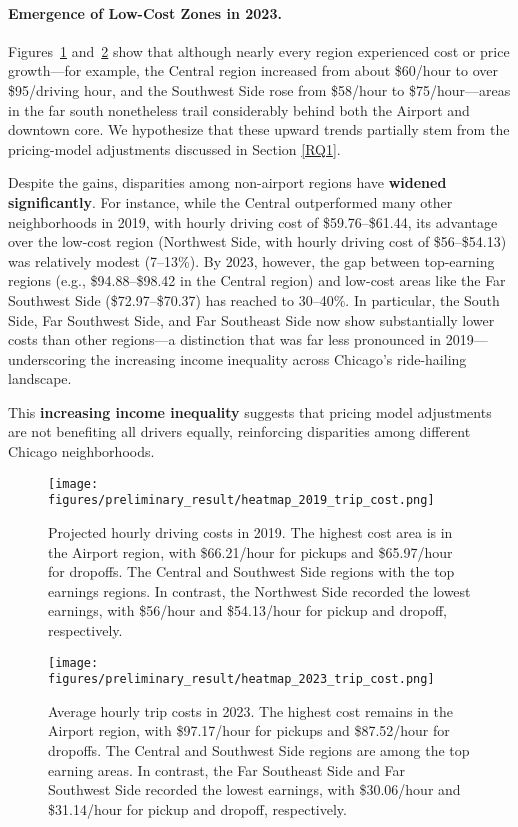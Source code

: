 \paragraph{\textbf{Emergence of Low-Cost Zones in 2023.}}

Figures~\ref{earnings_2019} and~\ref{earnings_2023} show that although nearly every region experienced cost or price growth---for example, the Central region increased from about \$60/hour to over \$95/driving hour, and the Southwest Side rose from \$58/hour to \$75/hour---areas in the far south nonetheless trail considerably behind both the Airport and downtown core. We hypothesize that these upward trends partially stem from the pricing-model adjustments discussed in Section \ref{RQ1}.

Despite the gains, disparities among non-airport regions have \textbf{widened significantly}. For instance, while the Central outperformed many other neighborhoods in 2019, with hourly driving cost of \$59.76--\$61.44, its advantage over the low-cost region (Northwest Side, with hourly driving cost of \$56--\$54.13) was relatively modest (7--13\%). By 2023, however, the gap between top-earning regions (e.g., \$94.88--\$98.42 in the Central region) and low-cost areas like the Far Southwest Side (\$72.97--\$70.37) has reached to 30--40\%. In particular, the South Side, Far Southwest Side, and Far Southeast Side now show substantially lower costs than other regions---a distinction that was far less pronounced in 2019---underscoring the increasing income inequality across Chicago’s ride-hailing landscape.


This \textbf{increasing income inequality} suggests that pricing model adjustments are not benefiting all drivers equally, reinforcing disparities among different Chicago neighborhoods.


\begin{figure}[H]
  \centering
  \texttt{[image: figures/preliminary\_result/heatmap\_2019\_trip\_cost.png]}
\caption{Projected hourly driving costs in 2019. The highest cost area is in the Airport region, with \$66.21/hour for pickups and \$65.97/hour for dropoffs. The Central and Southwest Side regions with the top earnings regions. In contrast, the Northwest Side recorded the lowest earnings, with \$56/hour and \$54.13/hour for pickup and dropoff, respectively.}
    \label{earnings_2019}
\end{figure}
\begin{figure}[H]
  \centering
  \texttt{[image: figures/preliminary\_result/heatmap\_2023\_trip\_cost.png]}
\caption{Average hourly trip costs in 2023. The highest cost remains in the Airport region, with \$97.17/hour for pickups and \$87.52/hour for dropoffs. The Central and Southwest Side regions are among the top earning areas. In contrast, the Far Southeast Side and Far Southwest Side recorded the lowest earnings, with \$30.06/hour and \$31.14/hour for pickup and dropoff, respectively.}
    \label{earnings_2023}
\end{figure}

